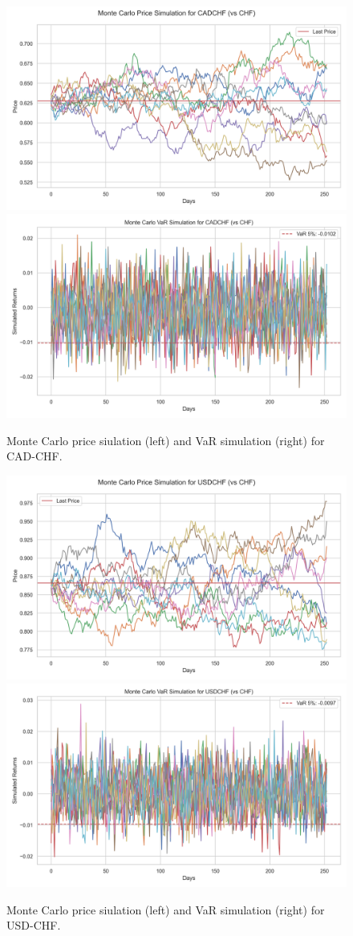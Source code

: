 \documentclass{article}
\begin{document}
\begin{figure}[H]
    \centering  \includegraphics[width=0.48\linewidth]{../../reports/figures/monte_carlo_price_simulation_CADCHF_vs_CHF.png} \label{fig:monte_carlo_price_simulation_CADCHF_vs_CHF}
    \includegraphics[width=0.48\linewidth]{../../reports/figures/monte_carlo_var_simulation_CADCHF_vs_CHF.png} \label{fig:monte_carlo_var_simulation_CADCHF_vs_CHF}
    \caption{\footnotesize Monte Carlo price siulation (left) and VaR simulation (right) for CAD-CHF.}
\end{figure}

\begin{figure}[H]
    \centering  \includegraphics[width=0.48\linewidth]{../../reports/figures/monte_carlo_price_simulation_USDCHF_vs_CHF.png} \label{fig:monte_carlo_price_simulation_USDCHF_vs_CHF}
    \includegraphics[width=0.48\linewidth]{../../reports/figures/monte_carlo_var_simulation_USDCHF_vs_CHF.png} \label{fig:monte_carlo_var_simulation_USDCHF_vs_CHF}
    \caption{\footnotesize Monte Carlo price siulation (left) and VaR simulation (right) for USD-CHF.}
\end{figure}
\end{document}
